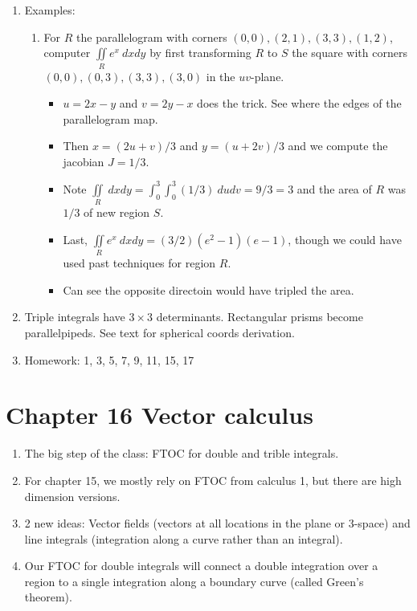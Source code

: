 \documentclass{article}
\newcommand{\ds}{\displaystyle}
\begin{document}
\begin{enumerate}
\item Examples:
\begin{enumerate}
\item For $R$ the parallelogram with corners $(0,0), (2,1), (3,3), (1,2)$, computer $\ds \iint\limits_R e^x ~dxdy$ by first transforming $R$ to $S$ the square with corners $(0,0), (0,3), (3,3), (3,0)$ in the $uv$-plane.
\begin{itemize}
\item $u=2x-y$ and $v=2y-x$ does the trick. See where the edges of the parallelogram map. 
\item Then $x=(2u+v)/3$ and $y=(u+2v)/3$ and we compute the jacobian $J=1/3$.
\item Note $\ds \iint\limits_R ~dxdy = \int_0^3 \int_0^3 (1/3)~dudv = 9/3=3$ and the area of $R$ was $1/3$ of new region $S$.
\item Last,  $\ds \iint\limits_R e^x ~dxdy=(3/2)(e^2-1)(e-1)$, though we could have used past techniques for region $R$.
\item Can see the opposite directoin would have tripled the area. 
\end{itemize}
\end{enumerate}


\item Triple integrals have $3 \times 3$ determinants. Rectangular prisms become parallelpipeds. See text for spherical coords derivation.

\item Homework: 1, 3, 5, 7, 9, 11, 15, 17

\end{enumerate}

\section{Chapter 16 Vector calculus}

\begin{enumerate}
\item The big step of the class: FTOC for double and trible integrals.
\item For chapter 15, we mostly rely on FTOC from calculus 1, but there are high dimension versions.
\item 2 new ideas: Vector fields (vectors at all locations in the plane or 3-space) and line integrals (integration along a curve rather than an integral).
\item Our FTOC for double integrals will connect a double integration over a region to a single integration along a boundary curve (called Green's theorem).
\end{enumerate}
\end{document}
